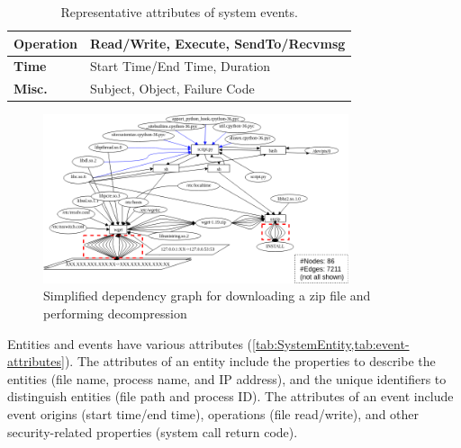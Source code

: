 \begin{table}[!t]
	\centering
	\caption{Representative attributes of system events.}\label{tab:event-attributes}
	\begin{adjustbox}{width=0.45\textwidth}
		\begin{tabular}{|l|l|}
			\hline
			\textbf{Operation}		& Read/Write, Execute, SendTo/Recvmsg\\\hline
			\textbf{Time}		& Start Time/End Time, Duration\\\hline
			\textbf{Misc.}		& Subject, Object, Failure Code\\\hline
		\end{tabular}
	\end{adjustbox}

		\vspace*{1ex}
\end{table}

\begin{figure}
    \centering
    \includegraphics[width=0.8\textwidth]{figs/fig-before.png}
    \caption{Simplified dependency graph for downloading a zip file and performing decompression}
    \label{fig:before}
\end{figure}

Entities and events have various attributes (\cref{tab:SystemEntity,tab:event-attributes}).
The attributes of an entity include the properties to describe the entities (\eg file name, process name, and IP address),
and the unique identifiers to distinguish entities (\eg file path and process ID).
The attributes of an event include event origins (\ie start time/end time),
operations (\eg file read/write),
and other security-related properties (\eg system call return code).





